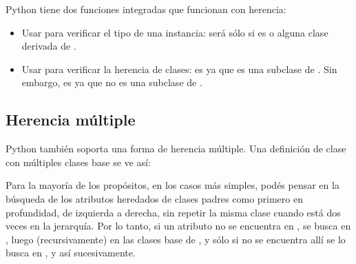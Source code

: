 \documentclass[a4,10pt,spanish]{sphinxmanual}
\begin{document}
\sphinxAtStartPar
Python tiene dos funciones integradas que funcionan con herencia:
\begin{itemize}
\item {} 
\sphinxAtStartPar
Usar  para verificar el tipo de una instancia:  será  sólo si  es  o alguna clase derivada de .

\item {} 
\sphinxAtStartPar
Usar  para verificar la herencia de clases:  es  ya que  es una subclase de . Sin embargo,  es  ya que  no es una subclase de .

\end{itemize}


\subsection{Herencia múltiple}
\label{\detokenize{tutorial/classes:multiple-inheritance}}\label{\detokenize{tutorial/classes:tut-multiple}}
\sphinxAtStartPar
Python también soporta una forma de herencia múltiple.  Una definición de clase con múltiples clases base se ve así:

\begin{sphinxVerbatim}[commandchars=\\\{\}]
   
\end{sphinxVerbatim}

\sphinxAtStartPar
Para la mayoría de los propósitos, en los casos más simples, podés pensar en la búsqueda de los atributos heredados de clases padres como primero en profundidad, de izquierda a derecha, sin repetir la misma clase cuando está dos veces en la jerarquía.  Por lo tanto, si un atributo no se encuentra en , se busca en , luego (recursivamente) en las clases base de , y sólo si no se encuentra allí se lo busca en , y así sucesivamente.
\end{document}
